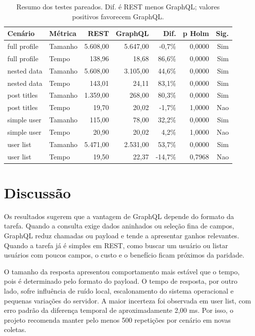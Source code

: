 \documentclass[journal]{IEEEtran}
\begin{document}
\begin{table}[!t]
\centering
\caption{Resumo dos testes pareados. Dif. é REST menos GraphQL; valores positivos favorecem GraphQL.}
\label{tab:tests}
\footnotesize
\setlength{\tabcolsep}{6pt}
\renewcommand{\arraystretch}{1.12}
\begin{tabular}{llrrrrr}
\toprule
Cenário & Métrica & REST & GraphQL & Dif. & p Holm & Sig. \\
\midrule
        full profile & Tamanho & 5.608,00 & 5.647,00 & -0,7\% & 0,0000 & Sim \\
        full profile & Tempo & 138,96 & 18,68 & 86,6\% & 0,0000 & Sim \\
        nested data & Tamanho & 5.608,00 & 3.105,00 & 44,6\% & 0,0000 & Sim \\
        nested data & Tempo & 143,01 & 24,11 & 83,1\% & 0,0000 & Sim \\
        post titles & Tamanho & 1.359,00 & 268,00 & 80,3\% & 0,0000 & Sim \\
        post titles & Tempo & 19,70 & 20,02 & -1,7\% & 1,0000 & Nao \\
        simple user & Tamanho & 115,00 & 78,00 & 32,2\% & 0,0000 & Sim \\
        simple user & Tempo & 20,90 & 20,02 & 4,2\% & 1,0000 & Nao \\
        user list & Tamanho & 5.471,00 & 2.531,00 & 53,7\% & 0,0000 & Sim \\
        user list & Tempo & 19,50 & 22,37 & -14,7\% & 0,7968 & Nao \\
\bottomrule
\end{tabular}
\end{table}

\section{Discussão}
\label{sec:discussion}

Os resultados sugerem que a vantagem de GraphQL depende do formato da tarefa. Quando a consulta exige dados aninhados ou seleção fina de campos, GraphQL reduz chamadas ou payload e tende a apresentar ganhos relevantes. Quando a tarefa já é simples em REST, como buscar um usuário ou listar usuários com poucos campos, o custo e o benefício ficam próximos da paridade.

O tamanho da resposta apresentou comportamento mais estável que o tempo, pois é determinado pelo formato do payload. O tempo de resposta, por outro lado, sofre influência de ruído local, escalonamento do sistema operacional e pequenas variações do servidor. A maior incerteza foi observada em user list, com erro padrão da diferença temporal de aproximadamente 2,00 ms. Por isso, o projeto recomenda manter pelo menos 500 repetições por cenário em novas coletas.
\end{document}
